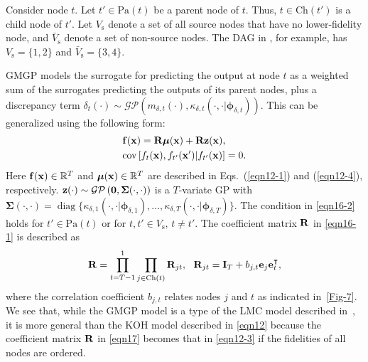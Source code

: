 \documentclass[iicol,sn-basic]{sn-jnl}%
\DeclareMathOperator{\diag}{diag}
\begin{document}
Consider node $t$.
Let $t' \in \text{Pa}(t)$ be a parent node of $t$.
Thus, $t \in \text{Ch}(t')$ is a child node of $t'$.
Let $V_\text{s}$ denote a set of all source nodes that have no lower-fidelity node, and $\bar{V}_\text{s}$ denote a set of non-source nodes.
The DAG in , for example, has $V_\text{s}=\{1,2\}$ and $\bar{V}_\text{s}=\{3,4\}$.

GMGP models the surrogate for predicting the output at node $t$ as a weighted sum of the surrogates predicting the outputs of its parent nodes, plus a discrepancy term $\delta_t(\cdot)\sim \mathcal{GP}\left(m_{\delta,t}(\cdot),\kappa_{\delta,t}(\cdot,\cdot|{\boldsymbol \phi}_{\delta,t})\right)$.
This can be generalized using the following form:
\begin{subequations}\label{eqn16}
	\begin{align}
		&{\bf f}({\bf x}) =  {\bf R} {\boldsymbol \mu}({\bf x}) + {\bf R} {\bf z}({\bf x}) \label{eqn16-1},\\
		&\text{cov}\left[f_{t}({\bf x}),f_{t'}({\bf x}')|f_{t'}({\bf x})\right]=0 \label{eqn16-2}.
\end{align}	
\end{subequations}
Here ${\bf f}({\bf x}) \in \mathbb{R}^T$ and ${\boldsymbol \mu}({\bf x}) \in \mathbb{R}^T$ are described in Eqs.~(\ref{eqn12-1}) and (\ref{eqn12-4}), respectively.
 ${\bf z}(\cdot) \sim \mathcal{GP}\left({\bf 0},{\boldsymbol \Sigma}(\cdot,\cdot)\right)$ is a $T$-variate GP with ${\boldsymbol \Sigma}(\cdot,\cdot) = \diag\{\kappa_{\delta,1}(\cdot,\cdot|{\boldsymbol \phi}_{\delta,1}),\dots,\kappa_{\delta,T}(\cdot,\cdot|{\boldsymbol \phi}_{\delta,T})\}$.
The condition in \cref{eqn16-2} holds for $t' \in  \text{Pa}(t)$ or for $t,t' \in  V_\text{s}, \, t \neq t'$.
The coefficient matrix ${\bf R}$ in \cref{eqn16-1} is described as
\begin{equation}\label{eqn17}
		{\bf R} = \prod_{t=T-1}^1 \prod_{j \in \text{Ch}(t)} {\bf R}_{jt}, \ \ {\bf R}_{jt} = {\bf I}_T + b_{j,t} {\bf e}_j {\bf e}^\intercal_{t},
\end{equation}
where the correlation coefficient $b_{j,t}$ relates nodes $j$ and $t$ as indicated in~\cref{Fig-7}.
We see that, while the GMGP model is a type of the LMC model described in~, it is more general than the KOH model described in \cref{eqn12} because the coefficient matrix ${\bf R}$ in \cref{eqn17} becomes that in \cref{eqn12-3} if the fidelities of all nodes are ordered.
		
\end{document}
